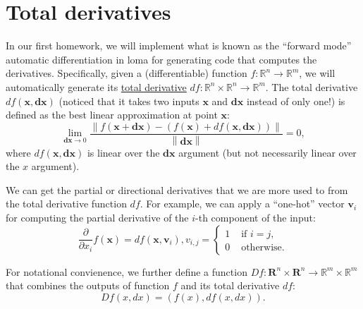 




\section{Total derivatives}

In our first homework, we will implement what is known as the ``forward mode'' automatic differentiation in loma for generating code that computes the derivatives. 
Specifically, given a (differentiable) function $f: \mathbb{R}^n \rightarrow \mathbb{R}^m$, we will automatically generate its \href{https://en.wikipedia.org/wiki/Total_derivative}{total derivative} $df: \mathbb{R}^n \times \mathbb{R}^n \rightarrow \mathbb{R}^m$. 
The total derivative $df(\mathbf{x}, \mathbf{dx})$ (noticed that it takes two inputs $\mathbf{x}$ and $\mathbf{dx}$ instead of only one!) is defined as the best linear approximation at point $\mathbf{x}$:
\begin{equation}
\lim_{\mathbf{dx} \rightarrow 0} \frac{\left\|f(\mathbf{x} + \mathbf{dx}) - \left(f(\mathbf{x}) + df(\mathbf{x}, \mathbf{dx})\right)\right\|}{\left\|\mathbf{dx}\right\|} = 0,
\label{eq:totalderiv}
\end{equation}
where $df(\mathbf{x}, \mathbf{dx})$ is linear over the $\mathbf{dx}$ argument (but not necessarily linear over the $x$ argument).

We can get the partial or directional derivatives that we are more used to from the total derivative function $df$. For example, we can apply a ``one-hot'' vector $\mathbf{v}_i$ for computing the partial derivative of the $i$-th component of the input:
\begin{equation}
\frac{\partial}{\partial x_i} f(\mathbf{x}) = df(\mathbf{x}, \mathbf{v}_i), v_{i,j} = \begin{cases}
1 & \text{ if } i = j, \\
0 & \text{ otherwise}.
\end{cases}
\end{equation}

For notational convienence, we further define a function $Df: \mathbf{R}^n \times \mathbf{R}^n \rightarrow \mathbb{R}^m \times \mathbb{R}^m$ that combines the outputs of function $f$ and its total derivative $df$:
\begin{equation}
Df(x, dx) = \left(f(x), df(x, dx)\right).
\end{equation}

